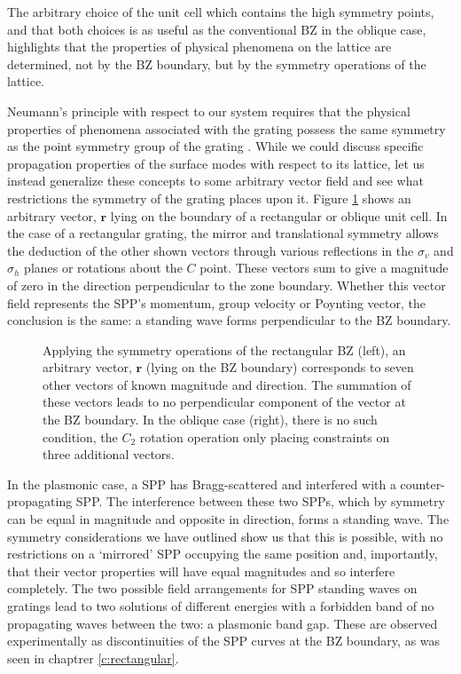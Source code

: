 The arbitrary choice of the unit cell which contains the high symmetry points, and that both choices is as useful as the conventional BZ in the oblique case, highlights that the properties of physical phenomena on the lattice are determined, not by the BZ boundary, but by the symmetry operations of the lattice.

Neumann’s principle with respect to our system requires that the physical properties of phenomena associated with the grating possess the same symmetry as the point symmetry group of the grating \cite{Newnham2005}. While we could discuss specific propagation properties of the surface modes with respect to its lattice, let us instead generalize these concepts to some arbitrary vector field and see what restrictions the symmetry of the grating places upon it.
Figure \ref{fig:ob-vecorfields} shows an arbitrary vector, $\mathbf{r}$ lying on the boundary of a rectangular or oblique unit cell. In the case of a rectangular grating, the mirror and translational symmetry allows the deduction of the other shown vectors through various reflections in the $\sigma_v$ and $\sigma_h$ planes or rotations about the $C$ point. These vectors sum to give a magnitude of zero in the direction perpendicular to the zone boundary. Whether this vector field represents the SPP’s momentum, group velocity or Poynting vector, the conclusion is the same: a standing wave forms perpendicular to the BZ boundary.
\begin{figure}
\centering 
\caption[Diagram of the cancellation of a vector field on a rectangular and oblique BZ boundary.]{Applying the symmetry operations of the rectangular BZ (left), an arbitrary vector, $\mathbf{r}$ (lying on the BZ boundary) corresponds to seven other vectors of known magnitude and direction. The summation of these vectors leads to no perpendicular component of the vector at the BZ boundary. In the oblique case (right), there is no such condition, the $C_2$ rotation operation only placing constraints on three additional vectors.\label{fig:ob-vecorfields}}
\end{figure}
In the plasmonic case, a SPP has Bragg-scattered and interfered with a counter-propagating SPP. The interference between these two SPPs, which by symmetry can be equal in magnitude and opposite in direction, forms a standing wave. The symmetry considerations we have outlined show us that this is possible, with no restrictions on a ‘mirrored’ SPP occupying the same position and, importantly, that their vector properties will have equal magnitudes and so interfere completely. The two possible field arrangements for SPP standing waves on gratings lead to two solutions of different energies with a forbidden band of no propagating waves between the two: a plasmonic band gap. These are observed experimentally as discontinuities of the SPP curves at the BZ boundary, as was seen in chaptrer \ref{c:rectangular}. 

